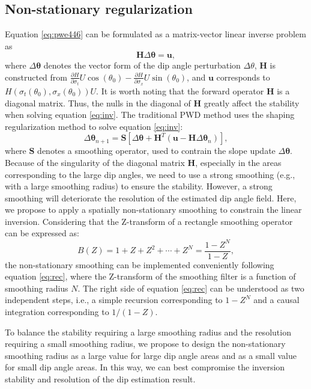 \subsection{Non-stationary regularization}
Equation \ref{eq:pwe446} can be formulated as a matrix-vector linear inverse problem as
\begin{equation}
\label{eq:inv}
\mathbf{H}\Delta \boldsymbol{\theta}=\mathbf{u},
\end{equation}
where $\Delta \boldsymbol{\theta}$ denotes the vector form of the dip angle perturbation $\Delta \theta$, $\mathbf{H}$ is constructed from $\frac{\partial H}{\partial \sigma_t}U\cos(\theta_0) - \frac{\partial H}{\partial \sigma_x}U\sin(\theta_0)$, and $\mathbf{u}$ corresponds to $H(\sigma_t(\theta_0),\sigma_x(\theta_0))U$. It is worth noting that the forward operator $\mathbf{H}$ is a diagonal matrix. Thus, the nulls in the diagonal of $\mathbf{H}$ greatly affect the stability when solving equation \ref{eq:inv}. The traditional PWD method \cite{pwd} uses the shaping regularization method to solve equation \ref{eq:inv}:
\begin{equation}
\label{eq:inv}
\Delta \boldsymbol{\theta}_{n+1} = \mathbf{S}[\Delta \boldsymbol{\theta}+\mathbf{H}^T(\mathbf{u}-\mathbf{H}\Delta \boldsymbol{\theta}_n)],
\end{equation}
where $\mathbf{S}$ denotes a smoothing operator, used to contrain the slope update $\Delta \boldsymbol{\theta}$. Because of the singularity of the diagonal matrix $\mathbf{H}$, especially in the areas corresponding to the large dip angles, we need to use a strong smoothing (e.g., with a large smoothing radius) to ensure the stability. However, a strong smoothing will deteriorate the resolution of the estimated dip angle field. Here, we propose to apply a spatially non-stationary smoothing to constrain the linear inversion.  Considering that the Z-transform of a rectangle smoothing operator can be expressed as:
\begin{equation}
\label{eq:rec}
B(Z)=1+Z+Z^2+\cdots+Z^N = \frac{1-Z^N}{1-Z},
\end{equation}
the non-stationary smoothing can be implemented conveniently following equation \ref{eq:rec}, where the Z-transform of the smoothing filter is a function of smoothing radius $N$. The right side of equation \ref{eq:rec} can be understood as two independent steps, i.e., a simple recursion corresponding to $1-Z^N$ and a causal integration corresponding to $1/(1-Z)$. 

To balance the stability requiring a large smoothing radius and the resolution requiring a small smoothing radius, we propose to design the non-stationary smoothing radius as a large value for large dip angle areas and as a small value for small dip angle areas. In this way, we can best compromise the inversion stability and resolution of the dip estimation result.



